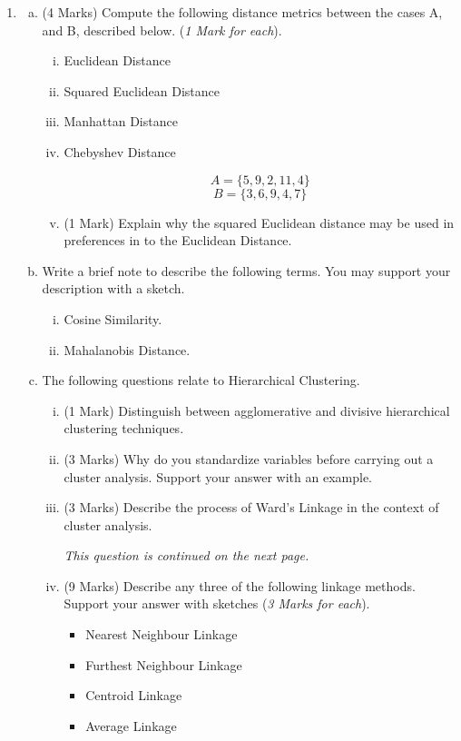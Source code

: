 \documentclass[a4paper,12pt]{article}
\begin{document}
\begin{enumerate}
\begin{enumerate}[(a)]
\begin{figure}[h!]
\end{figure}
\end{enumerate}
\newpage


	\item 
	\begin{enumerate}[(a)]
		\item (4 Marks)  Compute the following distance metrics between the cases A, and B, described below. (\textit{1 Mark for each}).
		\begin{enumerate}[(i)]
		\item Euclidean Distance
		\item Squared Euclidean Distance
		\item Manhattan Distance
		\item Chebyshev Distance
		
	
		\[ A = \{5,9,2,11,4\}\]
		\[ B = \{3,6,9,4,7\}\]
		\item (1 Mark) Explain why the squared Euclidean distance may be used in preferences in to the Euclidean Distance.
	\end{enumerate}

\bigskip 
\item Write a brief note to describe the following terms. You may support your description with a sketch.
\begin{enumerate}[(i)]
\item Cosine Similarity.
\item Mahalanobis Distance. 
\end{enumerate}


\bigskip 
\item The following questions relate to Hierarchical Clustering.


\begin{enumerate}[(i)]
\item (1 Mark) Distinguish between agglomerative and divisive hierarchical clustering techniques.
	
\item (3 Marks) Why do you standardize variables before carrying out a cluster analysis. Support your answer with an example.

\item (3 Marks) Describe the process of Ward's Linkage in the context of cluster analysis.


\noindent \textit{This question is continued on the next page.}
\newpage	
\item (9 Marks)  Describe any three of the following linkage methods. Support your answer with sketches (\textit{3 Marks for each}).
	\begin{itemize}
		\item Nearest Neighbour Linkage
		\item Furthest Neighbour Linkage
		\item Centroid Linkage
		\item Average Linkage
	\end{itemize}


\end{enumerate}
\end{enumerate}
\end{enumerate}
\end{document}

